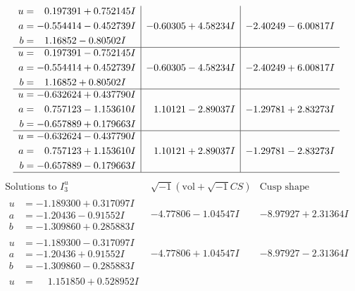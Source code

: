 \documentclass[1p]{elsarticle_modified}
\theoremstyle{definition}
\newcommand{\I}{\sqrt{-1}}
\begin{document}
$$\begin{array}{c|c|c}
\begin{aligned}
u &= \phantom{-}0.197391 + 0.752145 I \\
a &= -0.554414 - 0.452739 I \\
b &= \phantom{-}1.16852 - 0.80502 I\end{aligned}
 & -0.60305 + 4.58234 I & -2.40249 - 6.00817 I \\ \hline\begin{aligned}
u &= \phantom{-}0.197391 - 0.752145 I \\
a &= -0.554414 + 0.452739 I \\
b &= \phantom{-}1.16852 + 0.80502 I\end{aligned}
 & -0.60305 - 4.58234 I & -2.40249 + 6.00817 I \\ \hline\begin{aligned}
u &= -0.632624 + 0.437790 I \\
a &= \phantom{-}0.757123 - 1.153610 I \\
b &= -0.657889 + 0.179663 I\end{aligned}
 & \phantom{-}1.10121 - 2.89037 I & -1.29781 + 2.83273 I \\ \hline\begin{aligned}
u &= -0.632624 - 0.437790 I \\
a &= \phantom{-}0.757123 + 1.153610 I \\
b &= -0.657889 - 0.179663 I\end{aligned}
 & \phantom{-}1.10121 + 2.89037 I & -1.29781 - 2.83273 I\\
 \hline 
 \end{array}$$\newpage$$\begin{array}{c|c|c}  
\text{Solutions to }I^u_{3}& \I (\text{vol} + \sqrt{-1}CS) & \text{Cusp shape}\\
 \hline 
\begin{aligned}
u &= -1.189300 + 0.317097 I \\
a &= -1.20436 - 0.91552 I \\
b &= -1.309860 + 0.285883 I\end{aligned}
 & -4.77806 - 1.04547 I & -8.97927 + 2.31364 I \\ \hline\begin{aligned}
u &= -1.189300 - 0.317097 I \\
a &= -1.20436 + 0.91552 I \\
b &= -1.309860 - 0.285883 I\end{aligned}
 & -4.77806 + 1.04547 I & -8.97927 - 2.31364 I \\ \hline\begin{aligned}
u &= \phantom{-}1.151850 + 0.528952 I \\

\end{aligned}
\end{array}$$
\end{document}
